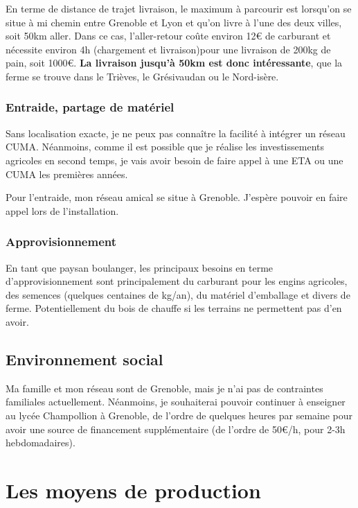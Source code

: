 \documentclass{article}
\begin{document}
En terme de distance de trajet livraison, le maximum à parcourir est lorsqu'on se situe à mi chemin entre Grenoble et Lyon et qu'on livre à l'une des deux villes, soit 50km aller. Dans ce cas, l'aller-retour coûte environ 12\euro{} de carburant et nécessite environ 4h (chargement et livraison)pour une livraison de 200kg de pain, soit 1000\euro. \textbf{La livraison jusqu'à 50km est donc intéressante}, que la ferme se trouve dans le Trièves, le Grésivaudan ou le Nord-isère.

\subsubsection*{Entraide, partage de matériel}

Sans localisation exacte, je ne peux pas connaître la facilité à intégrer un réseau CUMA. Néanmoins, comme il est possible que je réalise les investissements agricoles en second temps, je vais avoir besoin de faire appel à une ETA ou une CUMA les premières années. 

Pour l'entraide, mon réseau amical se situe à Grenoble. J'espère pouvoir en faire appel lors de l'installation.

\subsubsection*{Approvisionnement}

En tant que paysan boulanger, les principaux besoins en terme d'approvisionnement sont principalement du carburant pour les engins agricoles, des semences (quelques centaines de kg/an), du matériel d'emballage et divers de ferme. Potentiellement du bois de chauffe si les terrains ne permettent pas d'en avoir. 

\subsection{Environnement social}
 
Ma famille et mon réseau sont de Grenoble, mais je n'ai pas de contraintes familiales actuellement. Néanmoins, je souhaiterai pouvoir continuer à enseigner au lycée Champollion à Grenoble, de l'ordre de quelques heures par semaine pour avoir une source de financement supplémentaire (de l'ordre de 50\euro{}/h, pour 2-3h hebdomadaires). 

\section{Les moyens de production}
\end{document}
